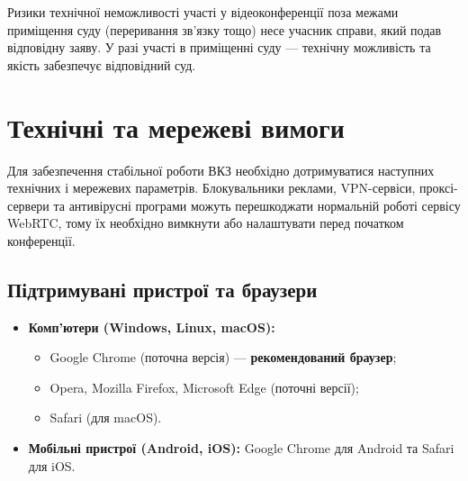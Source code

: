 \documentclass{article}
\begin{document}
Ризики технічної неможливості участі у відеоконференції поза межами приміщення суду (переривання зв’язку тощо) несе учасник справи, який подав відповідну заяву. У разі участі в приміщенні суду — технічну можливість та якість забезпечує відповідний суд.

\newpage

\section{Технічні та мережеві вимоги}

Для забезпечення стабільної роботи ВКЗ необхідно дотримуватися наступних технічних і мережевих параметрів. Блокувальники реклами, VPN-сервіси, проксі-сервери та антивірусні програми можуть перешкоджати нормальній роботі сервісу WebRTC, тому їх необхідно вимкнути або налаштувати перед початком конференції.

\subsection{Підтримувані пристрої та браузери}
\begin{itemize}
    \item \textbf{Комп'ютери (Windows, Linux, macOS):}
    \begin{itemize}
        \item Google Chrome (поточна версія) --- \textbf{рекомендований браузер};
        \item Opera, Mozilla Firefox, Microsoft Edge (поточні версії);
        \item Safari (для macOS).
    \end{itemize}
    \item \textbf{Мобільні пристрої (Android, iOS):} Google Chrome для Android та Safari для iOS.
\end{itemize}
\end{document}
